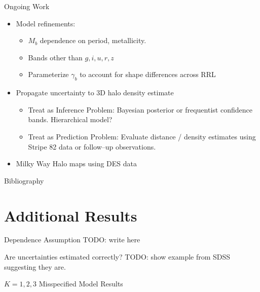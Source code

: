 \documentclass[12pt]{beamer}
\newcommand{\todo}[1]{{\color{red}TODO: #1}}
\begin{document}
\begin{frame}{Ongoing Work}
\begin{itemize}
\item Model refinements:
\begin{itemize}
\item $M_b$ dependence on period, metallicity.
\item Bands other than $g,i,u,r,z$
\item Parameterize $\gamma_b$ to account for shape differences across RRL
\end{itemize}
\item Propagate uncertainty to 3D halo density estimate
\begin{itemize}
\item Treat as Inference Problem: Bayesian posterior or frequentist confidence bands. Hierarchical model?
\item Treat as Prediction Problem: Evaluate distance / density estimates using Stripe 82 data or follow--up observations.
\end{itemize}
\item Milky Way Halo maps using DES data
\end{itemize}
\end{frame}



\begin{frame}[allowframebreaks]{Bibliography}
 
  \tiny{
  }
\end{frame}

\section*{Additional Results}

\begin{frame}{Dependence Assumption}
\todo{write here}
\end{frame}

\begin{frame}{Are uncertainties estimated correctly?}
\todo{show example from SDSS suggesting they are.}
\end{frame}


\begin{frame}{$K=1,2,3$ Misspecified Model Results}

\end{frame}
\end{document}
